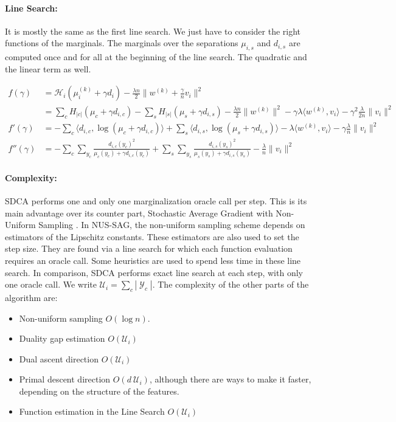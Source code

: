 \documentclass{article}
\DeclareMathOperator{\1}{\mathbb{1}}
\DeclareMathOperator{\Y}{\mathcal{Y}}
\begin{document}
\paragraph{Line Search:} 
It is mostly the same as the first line search.
We just have to consider the right functions of the marginals.
The marginals over the separations $\mu_{i, s}$ and $d_{i, s}$ are computed once and for all at the beginning of the line search.
The quadratic and the linear term as well.


\begin{align*}
	f(\gamma)
	& = \mathcal H_i(\mu_i^{(k)} + \gamma d_i) 
	- \frac{\lambda n}{2} \| w^{(k)} + \frac{\gamma}{n} v_i \|^2 
	\\
	& =  \sum_c H_{|c|}(\mu_c + \gamma d_{i, c}) 
	- \sum_s H_{|s|}(\mu_s + \gamma d_{i, s}) 
	- \frac{\lambda n}{2} \| w^{(k)}\|^2 
	- \gamma \lambda  \langle w^{(k)} , v_i \rangle 
	- \gamma^2 \frac{\lambda}{2n} \|v_i \|^2 
	\\
	f'(\gamma) & =  - \sum_c \langle d_{i, c}, \log(\mu_c + \gamma d_{i, c}) \rangle 
	+ \sum_s \langle d_{i, s} , \log(\mu_s + \gamma d_{i, s}) \rangle 
	- \lambda  \langle w^{(k)} , v_i \rangle 
	- \gamma \frac{\lambda}{n} \|v_i \|^2 
	\\
	f''(\gamma) & = - \sum_c \sum_{y_c} \frac{d_{i, c}(y_c)^2 }{ \mu_c(y_c) + \gamma d_{i, c}(y_c) }
	+ \sum_s \sum_{y_s} \frac{d_{i, s}(y_s)^2 }{ \mu_s(y_s) + \gamma d_{i, s}(y_s) }
	- \frac{\lambda}{n} \|v_i \|^2 
\end{align*}

\paragraph{Complexity:}
SDCA performs one and only one marginalization oracle call per step.
This is its main advantage over its counter part, Stochastic Average Gradient with Non-Uniform Sampling \cite{schmidt_non-uniform_2015}.
In NUS-SAG, the non-uniform sampling scheme depends on estimators of the Lipschitz constants.
These estimators are also used to set the step size.
They are found via a line search for which each function evaluation requires an oracle call.
Some heuristics are used to spend less time in these line search.
In comparison, SDCA performs exact line search at each step, with only one oracle call.
We write $\mathcal U_i = \sum_c |\Y_c|$. The complexity of the other parts of the algorithm are:
\begin{itemize}
	\item Non-uniform sampling $O(\log n)$.
	\item Duality gap estimation $O(\mathcal U_i)$
	\item Dual ascent direction $O(\mathcal U_i)$
	\item Primal descent direction $O(d \ \mathcal U_i)$, although there are ways to make it faster, depending on the structure of the features.
	\item Function estimation in the Line Search $O(\mathcal U_i)$
\end{itemize}



\end{document}
